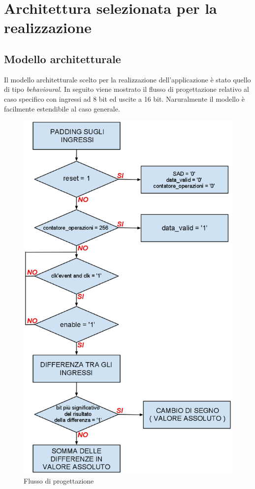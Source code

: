 \documentclass[12pt, a4paper]{article}
\begin{document}
\section{Architettura selezionata per la realizzazione}
\subsection{Modello architetturale}
Il modello architetturale scelto per la realizzazione dell'applicazione è stato quello di tipo \textit{behavioural}. In seguito viene mostrato il flusso di progettazione relativo al caso specifico con ingressi ad 8 bit ed uscite a 16 bit. Naruralmente il modello è facilmente estendibile al caso generale.
\begin{figure}[h!]
\centering
\includegraphics[scale=0.3]{images/sad_behaviour.eps}
\caption{Flusso di progettazione}\label{fig:1}
\end{figure}
\end{document}
